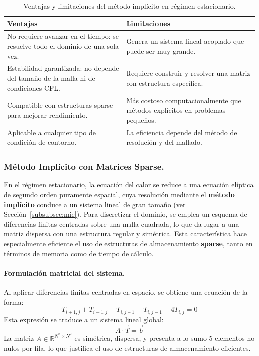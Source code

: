 \documentclass{article}
\begin{document}
\begin{table}[H]
\centering
\begin{tabular}{|p{6.5cm}|p{6.5cm}|}
\hline
\textbf{Ventajas} & \textbf{Limitaciones} \\
\hline
No requiere avanzar en el tiempo: se resuelve todo el dominio de una sola vez. & Genera un sistema lineal acoplado que puede ser muy grande. \\
\hline
Estabilidad garantizada: no depende del tamaño de la malla ni de condiciones CFL. & Requiere construir y resolver una matriz con estructura específica. \\
\hline
Compatible con estructuras sparse para mejorar rendimiento. & Más costoso computacionalmente que métodos explícitos en problemas pequeños. \\
\hline
Aplicable a cualquier tipo de condición de contorno. & La eficiencia depende del método de resolución y del mallado. \\
\hline
\end{tabular}
\caption{Ventajas y limitaciones del método implícito en régimen estacionario.}
\end{table}

\newpage
\subsubsection{Método Implícito con Matrices Sparse.}
En el régimen estacionario, la ecuación del calor se reduce a una ecuación elíptica de segundo orden puramente espacial, cuya resolución mediante el \textbf{método implícito} conduce a un sistema lineal de gran tamaño (ver Sección~\ref{subsubsec:mie}). Para discretizar el dominio, se emplea un esquema de diferencias finitas centradas sobre una malla cuadrada, lo que da lugar a una matriz dispersa con una estructura regular y simétrica. Esta característica hace especialmente eficiente el uso de estructuras de almacenamiento \textbf{sparse}, tanto en términos de memoria como de tiempo de cálculo.

\paragraph{Formulación matricial del sistema.} Al aplicar diferencias finitas centradas en espacio, se obtiene una ecuación de la forma:
$$
T_{i+1,j} + T_{i-1,j} + T_{i,j+1} + T_{i,j-1} - 4T_{i,j} = 0
$$
Esta expresión se traduce a un sistema lineal global:
$$
A \cdot \vec{T} = \vec{b}
$$
La matriz \( A \in \mathbb{R}^{N^2 \times N^2} \) es simétrica, dispersa, y presenta a lo sumo 5 elementos no nulos por fila, lo que justifica el uso de estructuras de almacenamiento eficientes.
\end{document}

